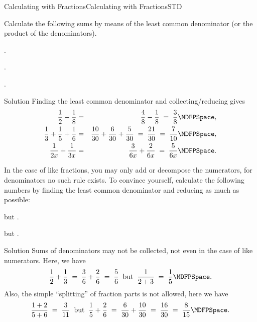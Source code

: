 \begin{MXContent}{Calculating with Fractions}{Calculating with Fractions}{STD}
\begin{MExercise}
Calculate the following sums by means of the least common denominator 
(or the product of the denominators).
\begin{MExerciseItems}
\item{.}
\item{.}
\item{.}
\end{MExerciseItems}

\begin{MHint}{Solution}
Finding the least common denominator and collecting/reducing gives
\begin{eqnarray*}
\Mdfrac12-\Mdfrac18 & = & \Mdfrac48-\Mdfrac18 \;=\; \Mdfrac38 \MDFPSpace ,\\
\Mdfrac13+\Mdfrac15+\Mdfrac16 & = & \Mdfrac{10}{30}+\Mdfrac6{30}+\Mdfrac{5}{30} \;=\; \Mdfrac{21}{30} \;=\; \Mdfrac{7}{10}\MDFPSpace ,\\
\Mdfrac1{2x}+\Mdfrac1{3x} & = & \Mdfrac{3}{6x}+\Mdfrac{2}{6x} \;=\; \Mdfrac{5}{6x} \MDFPSpace .
\end{eqnarray*}
\end{MHint}
\end{MExercise}

\begin{MExercise}
In the case of like fractions, you may only add or decompose the numerators, 
for denominators no such rule exists. To convince yourself, calculate the following numbers
by finding the least common denominator and reducing 
as much as possible:
\begin{MExerciseItems}
\item{ but .}
\item{ but .}
\end{MExerciseItems}
\begin{MHint}{Solution}
Sums of denominators may not be collected, not even in the case of like numerators. Here, we have
$$
\Mdfrac12+\Mdfrac13\;=\; \Mdfrac{3}{6}+\Mdfrac26 \;=\; \Mdfrac56\;\;\text{but}\;\;
\Mdfrac{1}{2+3} \;=\; \Mdfrac15\MDFPSpace .
$$
Also, the simple ``splitting'' of fraction parts is not allowed, here we have
$$
\Mdfrac{1+2}{5+6} \;=\; \Mdfrac{3}{11}  \;\;\text{but}\;\; \Mdfrac15+\Mdfrac26 \;=\; \Mdfrac{6}{30}+\Mdfrac{10}{30} \;=\; \Mdfrac{16}{30}\;=\; \Mdfrac{8}{15}\MDFPSpace .
$$
\end{MHint}
\end{MExercise}


\end{MXContent}
